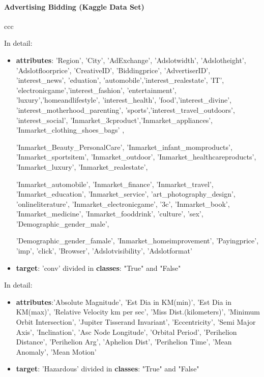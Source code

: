 \documentclass{article}
\begin{document}
\paragraph{Advertising Bidding (Kaggle Data Set)}
ccc

In detail:
\begin{itemize}
	\item  \textbf{attributes}: 'Region', 'City', 'AdExchange', 'Adslotwidth', 'Adslotheight', 'Adslotfloorprice',
	'CreativeID', 'Biddingprice', 'AdvertiserID', 'interest\_news', 'eduation', 'automobile','interest\_realestate', 'IT', 'electronicgame','interest\_fashion', 'entertainment', 'luxury','homeandlifestyle', 'interest\_health', 'food','interest\_divine', 'interest\_motherhood\_parenting', 'sports','interest\_travel\_outdoors', 'interest\_social', 'Inmarket\_3cproduct','Inmarket\_appliances', 'Inmarket\_clothing\_shoes\_bags' ,

	'Inmarket\_Beauty\_PersonalCare', 'Inmarket\_infant\_momproducts',
	'Inmarket\_sportsitem', 'Inmarket\_outdoor', 'Inmarket\_healthcareproducts',
	'Inmarket\_luxury', 'Inmarket\_realestate',

	'Inmarket\_automobile',
	'Inmarket\_finance', 'Inmarket\_travel', 'Inmarket\_education',
	'Inmarket\_service', 'art\_photography\_design',
	'onlineliterature', 'Inmarket\_electronicgame', '3c',
	'Inmarket\_book', 'Inmarket\_medicine', 'Inmarket\_fooddrink',
	'culture', 'sex',
	'Demographic\_gender\_male',

	'Demographic\_gender\_famale', 'Inmarket\_homeimprovement', 'Payingprice',
	'imp', 'click', 'Browser', 'Adslotvisibility', 'Adslotformat' \\

	\item  \textbf{target}: 'conv' divided in \textbf{classes}: "True" and "False"
\end{itemize}

In detail:
\begin{itemize}
	\item  \textbf{attributes}:'Absolute Magnitude', 'Est Dia in KM(min)', 'Est Dia in KM(max)', 'Relative Velocity km per sec', 'Miss Dist.(kilometers)', 'Minimum Orbit Intersection', 'Jupiter Tisserand Invariant', 'Eccentricity', 'Semi Major Axis', 'Inclination', 'Asc Node Longitude', 'Orbital Period', 'Perihelion   Distance', 'Perihelion Arg', 'Aphelion Dist', 'Perihelion Time', 'Mean Anomaly', 'Mean Motion' \\


	\item  \textbf{target}: 'Hazardous' divided in \textbf{classes}: "True" and "False"
\end{itemize}
\end{document}
